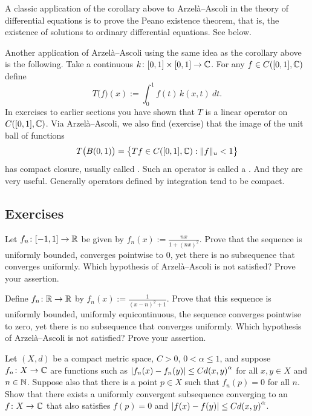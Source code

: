 A classic application of the corollary above to Arzel\`a--Ascoli
in the theory of differential
equations is to prove the Peano existence
theorem, that is, the existence of solutions to ordinary differential
equations.  See  below.

\medskip

Another application of Arzel\`a--Ascoli using the same idea as the
corollary above is the following.
Take a continuous $k \colon [0,1] \times [0,1] \to {\mathbb{C}}$.
For any $f \in C([0,1],{\mathbb{C}})$ define
\begin{equation*}
T\bigl(f\bigr)(x) :=  \int_0^1 f(t) \, k(x,t)~dt .
\end{equation*}
In exercises to earlier sections you have shown that 
$T$ is a linear operator on $C([0,1],{\mathbb{C}})$.
Via Arzel\`a--Ascoli, we also find (exercise) that
the image of the unit ball of functions
\begin{equation*}
T\bigl( B(0,1) \bigr) = 
\bigl\{
Tf \in C([0,1],{\mathbb{C}}) :  
\lVert {f} \rVert_u < 1
\bigr\}
\end{equation*}
has compact closure, usually called
\emph{}.
Such an operator is called a \emph{}.
And they are very useful.  Generally operators defined by
integration tend to be compact.

\subsection{Exercises}

\begin{exercise}
Let $f_n \colon [-1,1] \to {\mathbb{R}}$ be given by $f_n(x) := \frac{nx}{1+{(nx)}^2}$.
Prove that the sequence is uniformly bounded, converges pointwise to 0,
yet there is no
subsequence that converges uniformly.
Which hypothesis of Arzel\`a--Ascoli
is not satisfied?  Prove your assertion.
\end{exercise}

\begin{exercise}
Define $f_n \colon {\mathbb{R}} \to {\mathbb{R}}$ by $f_n(x) := \frac{1}{{(x-n)}^2+1}$.  Prove that
this sequence is uniformly bounded, uniformly equicontinuous, the sequence
converges pointwise to zero, yet there is no
subsequence that converges uniformly.
Which hypothesis of Arzel\`a--Ascoli
is not satisfied?  Prove your assertion.
\end{exercise}

\begin{exercise}
Let $(X,d)$ be a compact metric space, $C > 0$, $0 < \alpha \leq 1$, and
suppose $f_n \colon X \to {\mathbb{C}}$ are functions such as
$\left\lvert {f_n(x)-f_n(y)} \right\rvert \leq C {d(x,y)}^\alpha$ for all $x,y \in X$ and
$n \in {\mathbb{N}}$.  Suppose also that there is a point $p \in X$ such that
$f_n(p) = 0$ for all $n$.
Show that there exists a uniformly convergent subsequence converging to
an $f \colon X \to {\mathbb{C}}$ that also satisfies $f(p) = 0$ and
$\left\lvert {f(x)-f(y)} \right\rvert \leq C {d(x,y)}^\alpha$.
\end{exercise}


